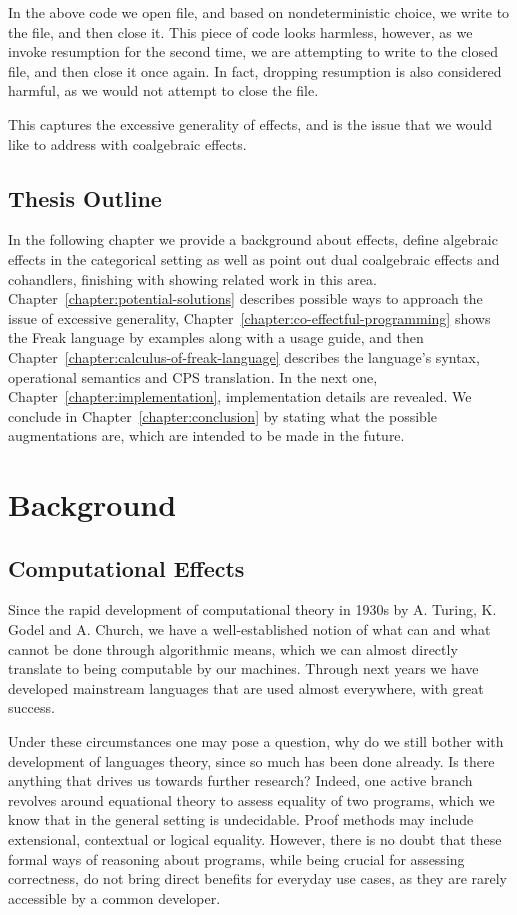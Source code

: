 \documentclass[declaration,shortabstract]{iithesis}
\theoremstyle{definition} \newtheorem{definition}{Definition}[chapter]
\theoremstyle{remark} \newtheorem{remark}[definition]{Observation}
\theoremstyle{plain} \newtheorem{theorem}[definition]{Theorem}
\theoremstyle{plain} \newtheorem{lemma}[definition]{Lemma}
\begin{document}
In the above code we open file, and based on nondeterministic choice, we write
to the file, and then close it. This piece of code looks harmless, however, as
we invoke resumption for the second time, we are attempting to write to the
closed file, and then close it once again. In fact, dropping resumption is also
considered harmful, as we would not attempt to close the file.

This captures the excessive generality of effects, and is the issue that we
would like to address with coalgebraic effects.

\section{Thesis Outline}


In the following chapter we provide a background about effects, define algebraic
effects in the categorical setting as well as point out dual coalgebraic effects
and cohandlers, finishing with showing related work in this area.
Chapter~\ref{chapter:potential-solutions} describes possible ways to approach
the issue of excessive generality, Chapter~\ref{chapter:co-effectful-programming}
shows the Freak language by examples along with a usage guide, and then
Chapter~\ref{chapter:calculus-of-freak-language} describes the language's syntax,
operational semantics and CPS translation. In the next one,
Chapter~\ref{chapter:implementation}, implementation details are revealed.
We conclude in Chapter~\ref{chapter:conclusion} by stating what the possible
augmentations are, which are intended to be made in the future.

\chapter{Background}\label{chapter:background}

\section{Computational Effects}

Since the rapid development of computational theory in 1930s by A. Turing,
K. Godel and A. Church, we have a well-established notion of what can and what
cannot be done through algorithmic means, which we can almost directly translate
to being computable by our machines. Through next years we have developed
mainstream languages that are used almost everywhere, with great success.

Under these circumstances one may pose a question, why do we still bother with
development of languages theory, since so much has been done already. Is there
anything that drives us towards further research? Indeed, one active branch
revolves around equational theory to assess equality of two programs, which we
know that in the general setting is undecidable. Proof methods may include
extensional, contextual or logical equality. However, there is no doubt that
these formal ways of reasoning about programs, while being crucial for assessing
correctness, do not bring direct benefits for everyday use cases, as they are
rarely accessible by a common developer.
\end{document}
